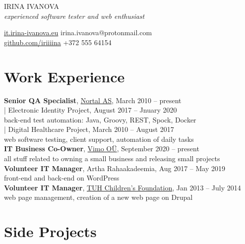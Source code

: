 \documentclass[a4paper, 12pt]{article}
\begin{document}
\begin{center}
  {\LARGE{IRINA IVANOVA}}\\
  \textit{experienced software tester and web enthusiast}
\end{center}
\href{https://it.irina-ivanova.eu}{it.irina-ivanova.eu}
\hspace{4.6cm}
irina.ivanova@protonmail.com\\
\href{https://github.com/iriiiina}{github.com/iriiiina}
\hspace{4.4cm}
+372 555 64154

\section{Work Experience}

\textbf{Senior QA Specialist}, \href{https://nortal.com}{Nortal AS}, March 2010 \--- present\\
\indent | Electronic Identity Project, August 2017 \--- Jnuary 2020\\
\indent \indent \indent back-end test automation: Java, Groovy, REST, Spock, Docker\\
\indent | Digital Healthcare Project, March 2010 \--- August 2017\\
\indent \indent \indent web software testing, client support, automation of daily tasks\\
\textbf{IT Business Co-Owner}, \href{https://vimo.ee/}{Vimo OÜ}, September 2020 \--- present\\
\indent \indent \indent all stuff related to owning a small business and releasing small projects\\
\textbf{Volunteer IT Manager}, Artha Rahaakadeemia, Aug 2017 \--- May 2019\\
\indent \indent \indent front-end and back-end on WordPress\\
\textbf{Volunteer IT Manager}, \href{https://www.lastefond.ee}{TUH Children's Foundation}, Jan 2013 \--- July 2014\\
\indent \indent \indent web page management, creation of a new web page on Drupal

\section{Side Projects}
\end{document}
